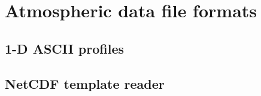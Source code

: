 \chapter{Atmospheric data file formats}\label{ChapAppendAtmosDataFormat}
\section{1-D ASCII profiles}\label{ChapAppendAtmosDataFormat1d}

\section{NetCDF template reader}

